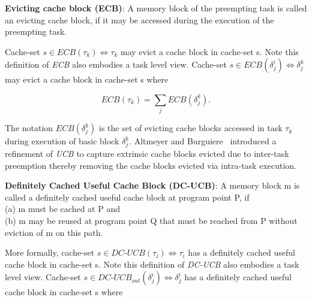 \begin{definition}
\textbf{Evicting cache block (ECB)}: A memory block of the preempting task is called an evicting cache block, if it may be accessed during the execution of the preempting task.
\end{definition}

\noindent Cache-set \begin{math}s \in \textit{ECB}(\tau_{k}) \Leftrightarrow \tau_{k}\end{math} may evict a cache block in cache-set s.  Note this definition of \textit{ECB} also embodies a task level view.  Cache-set \begin{math}s \in \textit{ECB}(\delta_{j}^{i}) \Leftrightarrow \delta_{j}^{k}\end{math} may evict a cache block in cache-set s where

\begin{equation}\label{eqn:ecb-task}
    \textit{ECB}(\tau_{k}) = \sum_{j} \textit{ECB}(\delta_{j}^{k}).
\end{equation}

\noindent The notation \begin{math}\textit{ECB}(\delta_{j}^{k})\end{math} is the set of evicting cache blocks accessed in task \begin{math}\tau_{k}\end{math} during execution of basic block \begin{math}\delta_{j}^{k}\end{math}.  Altmeyer and Burguiere~\cite{altmeyer:11c} introduced a refinement of \textit{UCB} to capture extrinsic cache blocks evicted due to inter-task preemption thereby removing the cache blocks evicted via intra-task execution.

\begin{definition}
\textbf{Definitely Cached Useful Cache Block (DC-UCB)}: A memory block m is called a definitely cached useful cache block at program point P, if \\(a) m must be cached at P and \\(b) m may be reused at program point Q that must be reached from P without eviction of m on this path.
\end{definition}

\noindent More formally, cache-set \begin{math}s \in \textit{DC-UCB}(\tau_{i}) \Leftrightarrow \tau_{i}\end{math} has a definitely cached useful cache block in cache-set s.  Note this definition of \textit{DC-UCB} also embodies a task level view.  Cache-set \begin{math}s \in \textit{DC-UCB}_{out}(\delta_{j}^{i}) \Leftrightarrow \delta_{j}^{i}\end{math} has a definitely cached useful cache block in cache-set s where

